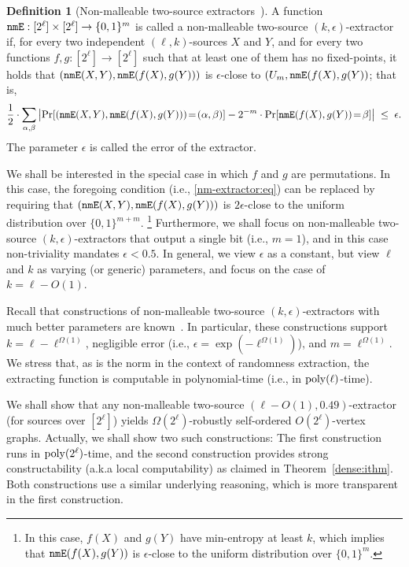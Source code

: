 \documentclass[10pt,a4paper]{article}
\theoremstyle{definition}
\newtheorem{definition}[theorem]{Definition}
\newcommand{\prob}{{\rm Pr}}
\newcommand{\e}{\epsilon}
\newcommand{\bitset}{\{0,1\}}
\newcommand{\BD}{\begin{definition}}   \newcommand{\ED}{\end{definition}}
\newcommand{\poly}{{\rm poly}}
\newcommand{\nmE}{{\tt nmE}}
\begin{document}
%
\BD[Non-malleable two-source extractors~{\cite[Def.~1.3]{CGL}}]
\label{nmExtractor:def}
A function ${\nmE}:[2^\ell]\times[2^\ell]\to\bitset^m$
is called a {\sf non-malleable two-source $(k,\e)$-extractor}
if, for every two independent $(\ell,k)$-sources $X$ and $Y$,
and for every two functions $f,g:[2^\ell]\to[2^\ell]$
such that at least one of them has no fixed-points,
it holds that $(\nmE(X,Y),\nmE(f(X),g(Y)))$ is $\e$-close
to $(U_m,\nmE(f(X),g(Y))$; that is,
\begin{equation}\label{nm-extractor:eq}
\frac12\cdot\sum_{\alpha,\beta}
    \left|\prob[(\nmE(X,Y),\nmE(f(X),g(Y)))\!=\!(\alpha,\beta)]
          -2^{-m}\cdot\prob[\nmE(f(X),g(Y))\!=\!\beta]\right|
 \;\leq\;\e.
\end{equation}
The parameter $\e$ is called the {\sf error} of the extractor.
%
\ED
We shall be interested in the special case in which $f$ and $g$
are permutations. In this case, the foregoing condition
(i.e., \eqref{nm-extractor:eq})
can be replaced by requiring that $(\nmE(X,Y),\nmE(f(X),g(Y)))$
is $2\e$-close to the uniform distribution over $\bitset^{m+m}$.
\footnote{In this case, $f(X)$ and $g(Y)$ have min-entropy at
least $k$, which implies that $\nmE(f(X),g(Y))$ is $\e$-close
to the uniform distribution over $\bitset^{m}$.}
%
Furthermore, we shall focus on non-malleable two-source $(k,\e)$-extractors
that output a single bit (i.e., $m=1$),
and in this case non-triviality mandates $\e<0.5$.
In general, we view $\e$ as a constant,
but view $\ell$ and $k$ as varying (or generic) parameters,
and focus on the case of $k=\ell-O(1)$.

Recall that constructions of non-malleable two-source $(k,\e)$-extractors
with much better parameters are known~\cite[Thm.~1]{CGL}.
In particular, these constructions support $k=\ell-\ell^{\Omega(1)}$,
negligible error (i.e., $\e=\exp(-\ell^{\Omega(1)})$),
and $m=\ell^{\Omega(1)}$.
We stress that, as is the norm in the context of randomness extraction,
the extracting function is computable in polynomial-time
(i.e., in $\poly(\ell)$-time).


%
We shall show that any non-malleable two-source $(\ell-O(1),0.49)$-extractor
(for sources over $[2^\ell]$)
yields $\Omega(2^\ell)$-robustly self-ordered $O(2^\ell)$-vertex graphs.
Actually, we shall show two such constructions:
The first construction runs in $\poly(2^\ell)$-time,
and the second construction provides strong constructability
(a.k.a local computability) as claimed in Theorem~\ref{dense:ithm}.
Both constructions use a similar underlying reasoning,
which is more transparent in the first construction.
\end{document}
